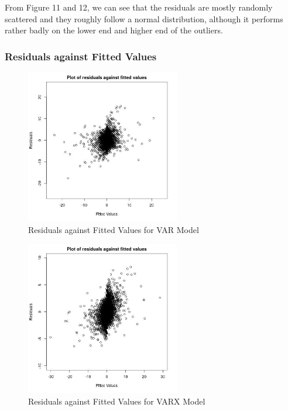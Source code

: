 \documentclass[12pt, letterpaper] {article}
\begin{document}
From Figure 11 and 12, we can see that the residuals are mostly randomly scattered and they roughly follow a normal distribution, although it performs rather badly on the lower end and higher end of the outliers. 


\subsubsection{Residuals against Fitted Values}

\begin{figure}[H]
    \centering
    \includegraphics[width=0.6\textwidth, height=0.3\textheight]{Images/Full_VAR_diff_resids_vs_values.jpg}
    \caption{Residuals against Fitted Values for VAR Model}
    \label{fig:Residuals against Fitted Values for VAR Model}
\end{figure}

\begin{figure}[H]
    \centering
    \includegraphics[width=0.6\textwidth, height=0.3\textheight]{Images/Full_VARX_diff_resids_vs_values.jpg}
    \caption{Residuals against Fitted Values for VARX Model}
    \label{fig:Residuals against Fitted Values for VARX Model}
\end{figure}
\end{document}
